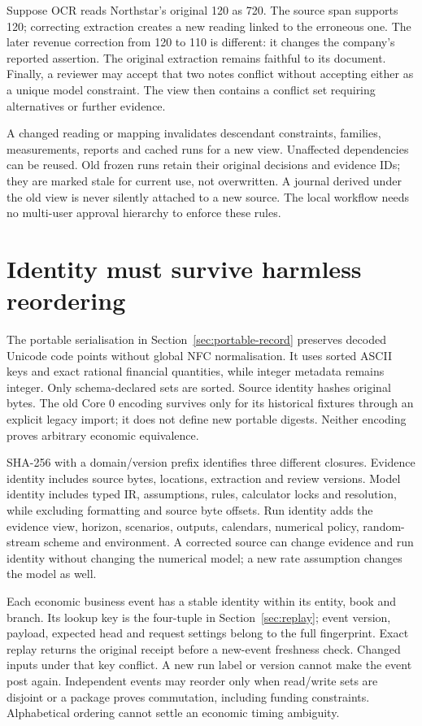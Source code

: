 Suppose OCR reads Northstar's original 120 as 720. The source span supports
120; correcting extraction creates a new reading linked to the erroneous
one. The later revenue correction from 120 to 110 is different: it changes
the company's reported assertion. The original extraction remains faithful
to its document. Finally, a reviewer may accept that two notes conflict
without accepting either as a unique model constraint. The view then contains
a conflict set requiring alternatives or further evidence.

A changed reading or mapping invalidates descendant constraints, families,
measurements, reports and cached runs for a new view. Unaffected dependencies
can be reused. Old frozen runs retain their original decisions and evidence
IDs; they are marked stale for current use, not overwritten. A journal derived
under the old view is never silently attached to a new source. The local
workflow needs no multi-user approval hierarchy to enforce these rules.

\section{Identity must survive harmless reordering}

The portable serialisation in Section~\ref{sec:portable-record} preserves
decoded Unicode code points without global NFC normalisation. It uses sorted
ASCII keys and exact rational financial quantities, while integer metadata
remains integer. Only schema-declared sets are sorted. Source identity hashes
original bytes. The old Core 0 encoding survives only for its historical
fixtures through an explicit legacy import; it does not define new portable
digests. Neither encoding proves arbitrary economic equivalence.

SHA-256 with a domain/version prefix identifies three different closures.
Evidence identity includes source bytes, locations, extraction and review
versions. Model identity includes typed IR, assumptions, rules, calculator
locks and resolution, while excluding formatting and source byte offsets.
Run identity adds the evidence view, horizon, scenarios, outputs, calendars,
numerical policy, random-stream scheme and environment. A corrected
source can change evidence and run identity without changing the numerical
model; a new rate assumption changes the model as well.

Each economic business event has a stable identity within its entity, book
and branch. Its lookup key is the four-tuple in Section~\ref{sec:replay};
event version, payload, expected head and request settings belong to the full
fingerprint. Exact replay returns the original receipt before a new-event
freshness check. Changed inputs under that key conflict. A new run label or
version cannot make the event post again. Independent events
may reorder only when read/write sets are disjoint or a package proves
commutation, including funding constraints. Alphabetical ordering cannot
settle an economic timing ambiguity.

